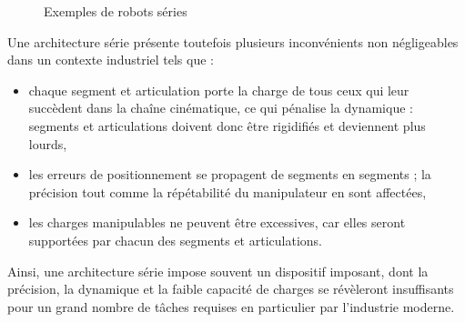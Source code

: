 \begin{figure}[!ht]
  \centering
       \hfill
    \caption{\footnotesize{Exemples de robots séries}}
\label{intro:fig2}
\end{figure}

Une architecture série présente toutefois plusieurs inconvénients non négli\-gea\-bles dans un contexte industriel tels que :
\begin{itemize}
 \item chaque segment et articulation porte la charge de tous ceux qui leur succèdent dans la chaîne cinématique, ce qui pénalise la dynamique : segments et articulations doivent donc être rigidifiés et deviennent plus lourds, 
 \item les erreurs de positionnement se propagent de segments en segments ; la précision tout comme la répétabilité du manipulateur en sont affectées,
 \item les charges manipulables ne peuvent être excessives, car elles seront supportées par chacun des segments et articulations.
\end{itemize}

Ainsi, une architecture série impose souvent un dispositif imposant, dont la précision, la dynamique et la faible capacité de charges se révèleront insuffisants pour un grand nombre de tâches requises en particulier par l'industrie moderne.

